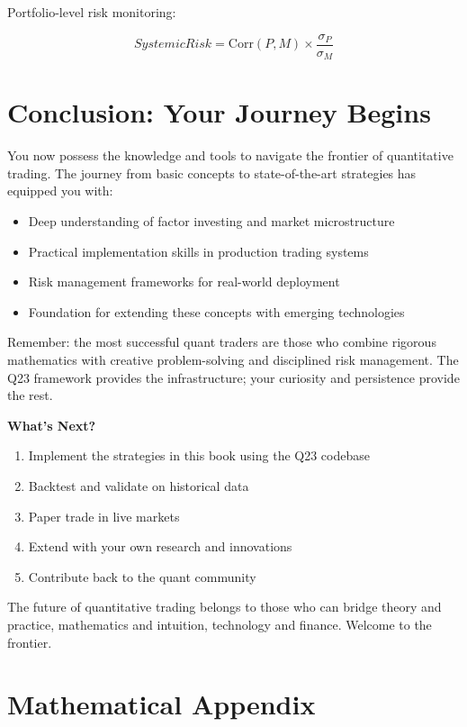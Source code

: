 \documentclass[11pt,letterpaper]{book}
\newcommand{\Corr}{\mathrm{Corr}}
\begin{document}
Portfolio-level risk monitoring:

\begin{equation}
SystemicRisk = \Corr(P, M) \times \frac{\sigma_P}{\sigma_M}
\end{equation}

\chapter{Conclusion: Your Journey Begins}

You now possess the knowledge and tools to navigate the frontier of quantitative trading. The journey from basic concepts to state-of-the-art strategies has equipped you with:

\begin{itemize}
    \item Deep understanding of factor investing and market microstructure
    \item Practical implementation skills in production trading systems
    \item Risk management frameworks for real-world deployment
    \item Foundation for extending these concepts with emerging technologies
\end{itemize}

Remember: the most successful quant traders are those who combine rigorous mathematics with creative problem-solving and disciplined risk management. The Q23 framework provides the infrastructure; your curiosity and persistence provide the rest.

\textbf{What's Next?}

\begin{enumerate}
    \item Implement the strategies in this book using the Q23 codebase
    \item Backtest and validate on historical data
    \item Paper trade in live markets
    \item Extend with your own research and innovations
    \item Contribute back to the quant community
\end{enumerate}

The future of quantitative trading belongs to those who can bridge theory and practice, mathematics and intuition, technology and finance. Welcome to the frontier.

\appendix

\chapter{Mathematical Appendix}
\end{document}
